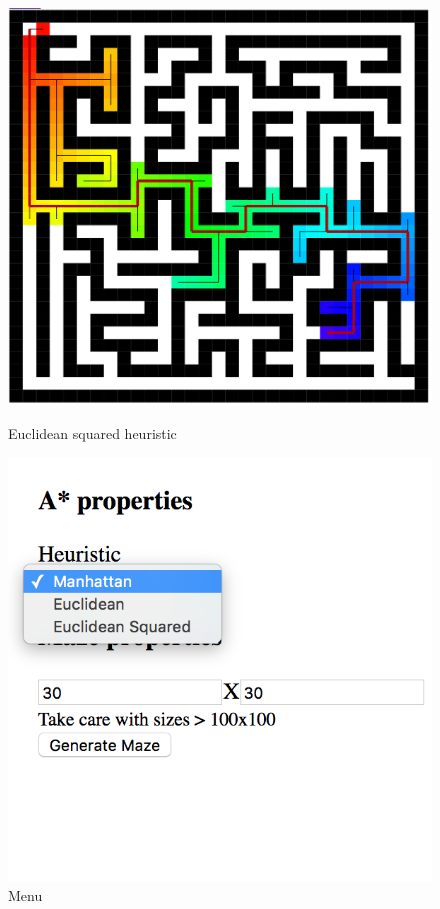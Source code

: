 \documentclass[titlepage]{article}
\begin{document}
\begin{figure}[!htb]
  \includegraphics[width=\linewidth]{Squared.png}
  \caption{Euclidean squared heuristic}\label{fig:uecsqr}
\endminipage\hfill
{}
  \includegraphics[width=\linewidth]{Nverter.png}
  \caption{Menu}\label{fig:meun}
\endminipage\hfill
\end{figure}
\end{document}
